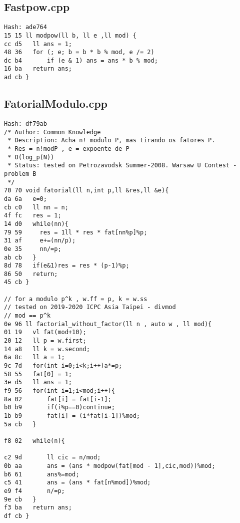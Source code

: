 \documentclass[11pt, a4paper, twoside]{article}
\begin{document}
\subsection{Fastpow.cpp}
\begin{lstlisting}
Hash: ade764
15 15 ll modpow(ll b, ll e ,ll mod) {
cc d5 	ll ans = 1;
48 36 	for (; e; b = b * b % mod, e /= 2)
dc b4 		if (e & 1) ans = ans * b % mod;
16 ba 	return ans;
ad cb }
\end{lstlisting}

\subsection{FatorialModulo.cpp}
\begin{lstlisting}
Hash: df79ab
/* Author: Common Knowledge
 * Description: Acha n! modulo P, mas tirando os fatores P.
 * Res = n!modP , e = expoente de P
 * O(log_p(N))
 * Status: tested on Petrozavodsk Summer-2008. Warsaw U Contest - problem B
 */
70 70 void fatorial(ll n,int p,ll &res,ll &e){
da 6a   e=0;
cb c0   ll nn = n;
4f fc   res = 1;
14 d0   while(nn){
79 59     res = 1ll * res * fat[nn%p]%p;
31 af     e+=(nn/p);
0e 35     nn/=p;
ab cb   }
8d 78   if(e&1)res = res * (p-1)%p;
86 50   return;
45 cb }

// for a modulo p^k , w.ff = p, k = w.ss
// tested on 2019-2020 ICPC Asia Taipei - divmod
// mod == p^k
0e 96 ll factorial_without_factor(ll n , auto w , ll mod){
01 19 	vl fat(mod+10);
20 12 	ll p = w.first;
14 a8 	ll k = w.second;
6a 8c 	ll a = 1;
9c 7d 	for(int i=0;i<k;i++)a*=p;
58 55 	fat[0] = 1;
3e d5 	ll ans = 1;
f9 56 	for(int i=1;i<mod;i++){
8a 02 		fat[i] = fat[i-1];
b0 b9 		if(i%p==0)continue;
1b b9 		fat[i] = (i*fat[i-1])%mod;
5a cb 	}
       
f8 02 	while(n){
       
c2 9d 		ll cic = n/mod;
0b aa 		ans = (ans * modpow(fat[mod - 1],cic,mod))%mod;
b6 61 		ans%=mod;
c5 41 		ans = (ans * fat[n%mod])%mod;
e9 f4 		n/=p;
9e cb 	}
f3 ba 	return ans;
df cb }
\end{lstlisting}
\end{document}
